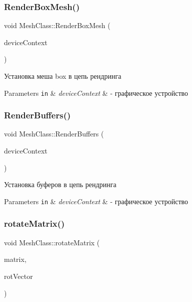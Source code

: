 \subsubsection{\texorpdfstring{Render\+Box\+Mesh()}{RenderBoxMesh()}}
{\footnotesize\ttfamily void Mesh\+Class\+::\+Render\+Box\+Mesh (\begin{DoxyParamCaption}\item[{I\+D3\+D11\+Device\+Context $\ast$}]{device\+Context }\end{DoxyParamCaption})}



Установка меша box в цепь рендринга 


\begin{DoxyParams}[1]{Parameters}
\mbox{\tt in}  & {\em device\+Context} & -\/ графическое устройство \\
\hline
\end{DoxyParams}
\mbox{\label{class_mesh_class_a98e3d97acabf6b48d17152af2efb214c}} 
\subsubsection{\texorpdfstring{Render\+Buffers()}{RenderBuffers()}}
{\footnotesize\ttfamily void Mesh\+Class\+::\+Render\+Buffers (\begin{DoxyParamCaption}\item[{I\+D3\+D11\+Device\+Context $\ast$}]{device\+Context }\end{DoxyParamCaption})\hspace{0.3cm}{\ttfamily [private]}}



Установка буферов в цепь рендринга 


\begin{DoxyParams}[1]{Parameters}
\mbox{\tt in}  & {\em device\+Context} & -\/ графическое устройство \\
\hline
\end{DoxyParams}
\mbox{\label{class_mesh_class_a960255c0f0f255f6a4a97487eadbeae4}} 
\subsubsection{\texorpdfstring{rotate\+Matrix()}{rotateMatrix()}}
{\footnotesize\ttfamily void Mesh\+Class\+::rotate\+Matrix (\begin{DoxyParamCaption}\item[{D3\+D\+X\+M\+A\+T\+R\+IX \&}]{matrix,  }\item[{D3\+D\+X\+V\+E\+C\+T\+O\+R3}]{rot\+Vector }\end{DoxyParamCaption})\hspace{0.3cm}{\ttfamily [static]}}



